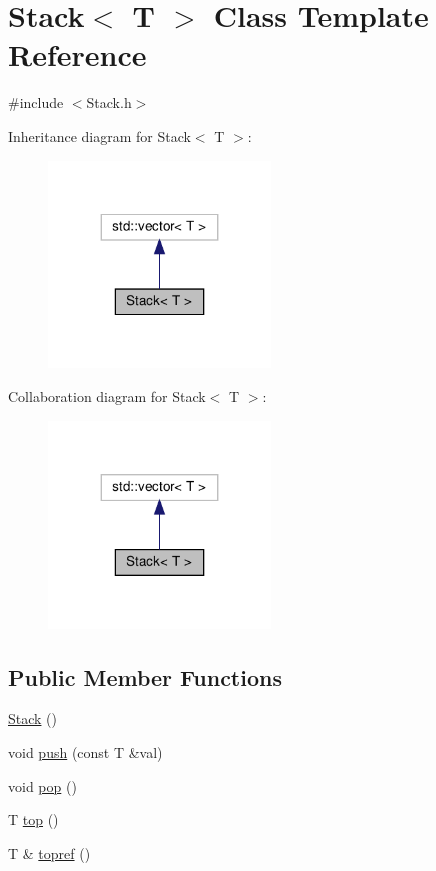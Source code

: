 \hypertarget{class_stack}{}\section{Stack$<$ T $>$ Class Template Reference}
\label{class_stack}


{\ttfamily \#include $<$Stack.\+h$>$}



Inheritance diagram for Stack$<$ T $>$\+:\nopagebreak
\begin{figure}[H]
\begin{center}
\leavevmode
\includegraphics[width=167pt]{class_stack__inherit__graph}
\end{center}
\end{figure}


Collaboration diagram for Stack$<$ T $>$\+:\nopagebreak
\begin{figure}[H]
\begin{center}
\leavevmode
\includegraphics[width=167pt]{class_stack__coll__graph}
\end{center}
\end{figure}
\subsection*{Public Member Functions}
\begin{DoxyCompactItemize}
\item 
\hyperlink{class_stack_aefee698059467258bbd79045aca62a63}{Stack} ()
\item 
void \hyperlink{class_stack_a6e8312460808f468b004d709d3308757}{push} (const T \&val)
\item 
void \hyperlink{class_stack_a2723aec5c7e2611b97fcffeb7709de33}{pop} ()
\item 
T \hyperlink{class_stack_ad461f6de40c8672dbf743068f4515061}{top} ()
\item 
T \& \hyperlink{class_stack_a318da5613921ddf481a21c62ce006c3c}{topref} ()
\end{DoxyCompactItemize}


